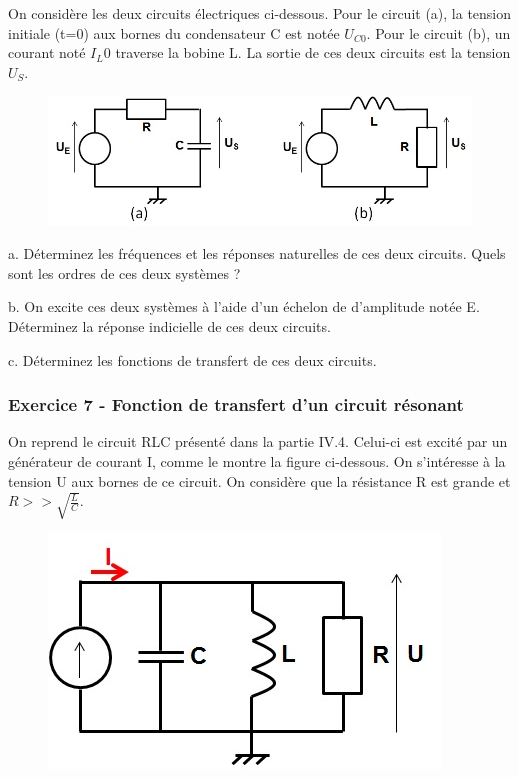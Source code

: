	On considère les deux circuits électriques ci-dessous. Pour le
        circuit (a), la tension initiale (t=0) aux bornes du
        condensateur C est notée $U_{C0}$. Pour le circuit (b), un
        courant noté $I_L0$ traverse la bobine L. La sortie de ces
        deux circuits est la tension $U_{S}$.
	
	\begin{figure}[htbp]
          \centering \includegraphics[scale=0.5]{images/Exo_2_4.jpg}
	\end{figure}
	
	a. Déterminez les fréquences et les réponses naturelles de ces
        deux circuits. Quels sont les ordres de ces deux systèmes ?
	
	b. On excite ces deux systèmes à l'aide d'un échelon de
        \Heaviside{} d'amplitude notée E. Déterminez la réponse
        indicielle de ces deux circuits.
	
	c. Déterminez les fonctions de transfert de ces deux circuits.
	
	\vspace{1\baselineskip}
	
	\subsubsection{Exercice 7 - Fonction de transfert d'un circuit
          résonant}
	
	On reprend le circuit RLC présenté dans la partie
        IV.4. Celui-ci est excité par un générateur de courant I,
        comme le montre la figure ci-dessous. On s'intéresse à la
        tension U aux bornes de ce circuit. On considère que la
        résistance R est grande et $R>>\sqrt{\frac{L}{C}}$.
 	 	
 	\begin{figure}[htbp]
          \centering \includegraphics[scale=0.5]{images/Exo_2_5.jpg}
 	\end{figure}
 
